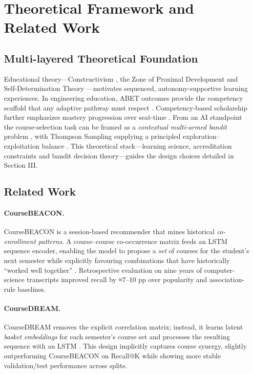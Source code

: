 \documentclass[conference]{IEEEtran}
\begin{document}
\section{Theoretical Framework and Related Work}

\subsection{Multi-layered Theoretical Foundation}
Educational theory—Constructivism \cite{Piaget1954}, the Zone of Proximal Development \cite{Vygotsky1978} and Self-Determination Theory \cite{DeciRyan2008}—motivates sequenced, autonomy-supportive learning experiences.  
In engineering education, ABET outcomes provide the competency scaffold that any adaptive pathway must respect \cite{ABET2023}.  
Competency-based scholarship further emphasizes mastery progression over seat-time \cite{Smith2005}.  
From an AI standpoint the course-selection task can be framed as a \emph{contextual multi-armed bandit} problem \cite{Auer2002,Li2010}, with Thompson Sampling supplying a principled exploration–exploitation balance \cite{Agrawal2013}.  
This theoretical stack—learning science, accreditation constraints and bandit decision theory—guides the design choices detailed in Section III.

\subsection{Related Work}\label{sec:related}

\paragraph*{CourseBEACON.}
CourseBEACON is a session-based recommender that mines historical \emph{co-enrollment patterns}.  
A course–course co-occurrence matrix feeds an LSTM sequence encoder, enabling the model to propose a \emph{set} of courses for the student’s next semester while explicitly favouring combinations that have historically “worked well together” \cite{Khan2023Beacon}.  
Retrospective evaluation on nine years of computer-science transcripts improved recall by ≈7–10 pp over popularity and association-rule baselines.

\paragraph*{CourseDREAM.}
CourseDREAM removes the explicit correlation matrix; instead, it learns latent \emph{basket embeddings} for each semester’s course set and processes the resulting sequence with an LSTM \cite{Khan2023Dream}.  
This design implicitly captures course synergy, slightly outperforming CourseBEACON on Recall@K while showing more stable validation/test performance across splits.
\end{document}
